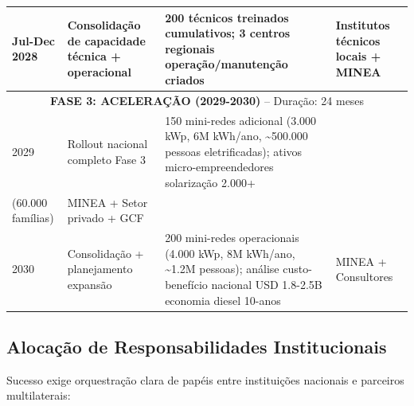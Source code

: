 \documentclass[12pt, a4paper]{article}
\begin{document}
\begin{table}[H]
\begin{tabular}{p{1.2cm}|p{3.2cm}|p{2.8cm}|p{2.5cm}|}
\midrule
Jul-Dec 2028 & Consolidação de capacidade técnica + operacional & 200 técnicos treinados cumulativos; 3 centros regionais operação/manutenção criados & Institutos técnicos locais + MINEA \\
\midrule
\multicolumn{4}{c}{\textbf{FASE 3: ACELERAÇÃO (2029-2030)} -- Duração: 24 meses} \\
\midrule
2029 & Rollout nacional completo Fase 3 & 150 mini-redes adicional (3.000 kWp, 6M kWh/ano, \textasciitilde{}500.000 pessoas eletrificadas); ativos micro-empreendedores solarização 2.000+ \\
(60.000 famílias) & MINEA + Setor privado + GCF \\
\midrule
2030 & Consolidação + planejamento expansão & 200 mini-redes operacionais (4.000 kWp, 8M kWh/ano, \textasciitilde{}1.2M pessoas); análise custo-benefício nacional USD 1.8-2.5B economia diesel 10-anos & MINEA + Consultores \\
\bottomrule
\end{tabular}
\end{table}

\subsection{Alocação de Responsabilidades Institucionais}

Sucesso exige orquestração clara de papéis entre instituições nacionais e parceiros multilaterais:
\end{document}
